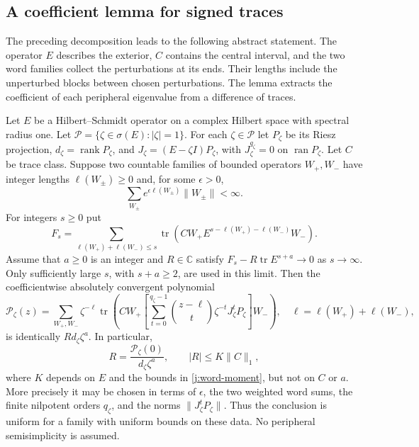 \subsection{A coefficient lemma for signed traces}

The preceding decomposition leads to the following abstract statement.
The operator $E$ describes the exterior, $C$ contains the central
interval, and the two word families collect the perturbations at its
ends. Their lengths include the unperturbed blocks between chosen
perturbations. The lemma extracts the coefficient of each peripheral
eigenvalue from a difference of traces.

\begin{lemma}\label{j:trace-extraction}
Let $E$ be a Hilbert--Schmidt operator on a complex Hilbert space with
spectral radius one. Let $\mathcal P=\{\zeta\in\sigma(E):|\zeta|=1\}$.
For each $\zeta\in\mathcal P$ let $P_\zeta$ be its Riesz projection,
$d_\zeta=\operatorname{rank}P_\zeta$, and
$J_\zeta=(E-\zeta I)P_\zeta$, with
$J_\zeta^{q_\zeta}=0$ on $\operatorname{ran}P_\zeta$.
Let $C$ be trace class. Suppose two countable families of bounded
operators $W_+,W_-$ have integer lengths $\ell(W_\pm)\ge0$ and, for
some $\epsilon>0$,
\begin{equation}\label{j:word-moment}
 \sum_{W_\pm}e^{\epsilon\ell(W_\pm)}\|W_\pm\|<\infty.
\end{equation}
For integers $s\ge0$ put
\[
 F_s=\sum_{\ell(W_+)+\ell(W_-)\le s}
 \operatorname{tr}(CW_+E^{s-\ell(W_+)-\ell(W_-)}W_-).
\]
Assume that $a\ge0$ is an integer and $R\in\mathbb C$ satisfy
$F_s-R\operatorname{tr}E^{s+a}\to0$ as $s\to\infty$.
Only sufficiently large $s$, with $s+a\ge2$, are used in this limit.
Then the coefficientwise absolutely convergent polynomial
\[
 \mathcal P_\zeta(z)=\sum_{W_+,W_-}\zeta^{-\ell}
 \operatorname{tr}\left(CW_+
 \left[\sum_{t=0}^{q_\zeta-1}
 \binom{z-\ell}{t}\zeta^{-t}J_\zeta^tP_\zeta\right]W_-\right),
 \quad \ell=\ell(W_+)+\ell(W_-),
\]
is identically $R d_\zeta\zeta^a$. In particular,
\[
 R=\frac{\mathcal P_\zeta(0)}{d_\zeta\zeta^a},\qquad
 |R|\le K\|C\|_1,
\]
where $K$ depends on $E$ and the bounds in \eqref{j:word-moment}, but
not on $C$ or $a$. More precisely it may be chosen in terms of
$\epsilon$, the two weighted word sums, the finite nilpotent orders
$q_\zeta$, and the norms $\|J_\zeta^tP_\zeta\|$.
Thus the conclusion is uniform for a family with uniform bounds on
these data. No peripheral semisimplicity is assumed.
\end{lemma}

